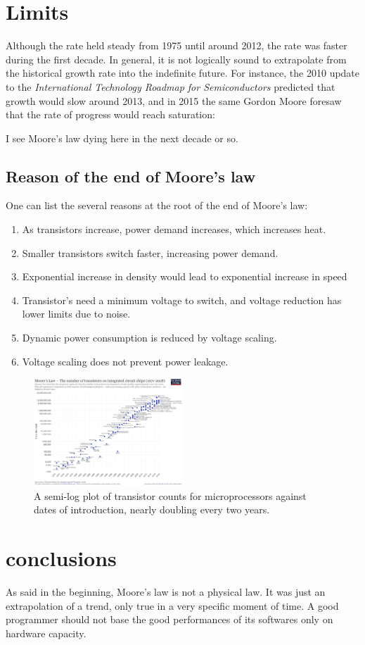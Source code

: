 \documentclass[10pt]{article}
\begin{document}
\section*{Limits}
Although the rate held steady from 1975 until around 2012, the rate was faster during the first decade.
In general, it is not logically sound to extrapolate from the historical growth rate into the indefinite future.
For instance, the 2010 update to the \emph{International Technology Roadmap for Semiconductors} predicted that growth would slow around 2013, and in 2015 the same Gordon Moore foresaw that the rate of progress would reach saturation:

\begin{displayquote}
  I see Moore's law dying here in the next decade or so.
\end{displayquote}

\subsection*{Reason of the end of Moore's law}
One can list the several reasons at the root of the end of Moore's law:

\begin{enumerate}
\item As transistors increase, power demand increases, which
increases heat.
\item Smaller transistors switch faster, increasing power demand.
\item Exponential increase in density would lead to
exponential increase in speed
\item Transistor’s need a minimum voltage to switch, and
voltage reduction has lower limits due to noise.
\item Dynamic power consumption is reduced by voltage
scaling.
\item Voltage scaling does not prevent power leakage.
\end{enumerate}

\begin{figure}[ht!]
\centering
  \includegraphics[width=0.5\textwidth]{Images/Moore's_Law_Transistor_Count.png}
\caption{A semi-log plot of transistor counts for microprocessors against dates of introduction, nearly doubling every two years.}\label{Mooreslaw}
\end{figure}

\section*{conclusions}
As said in the beginning, Moore's law is not a physical law.
It was just an extrapolation of a trend, only true in a very specific moment of time.
A good programmer should not base the good performances of its softwares only on hardware capacity.
\end{document}
